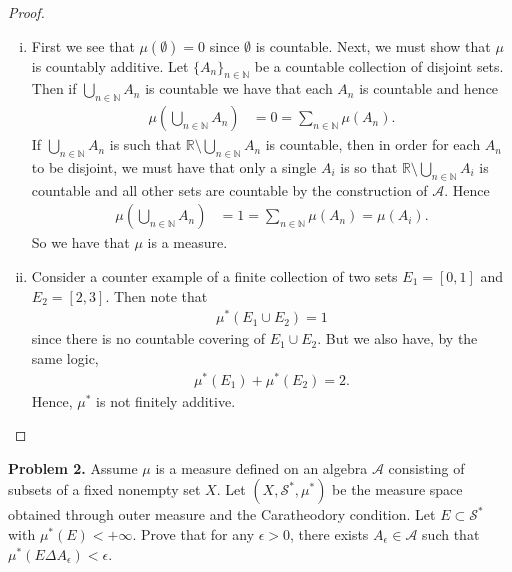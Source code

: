 \documentclass[leqno]{article}
\theoremstyle{nonumberplain}
\newtheorem{proof}{Proof}
\newcommand{\R}{\mathbb{R}}
\newcommand{\N}{\mathbb{N}}
\begin{document}
\begin{proof}~
\begin{enumerate}[(i)]
\item First we see that $\mu(\emptyset)=0$ since $\emptyset$ is countable. Next, we must show that $\mu$ is countably additive. Let $\{A_n\}_{n\in \N}$ be a countable collection of disjoint sets. Then if $\bigcup_{n\in \N} A_n$ is countable we have that each $A_n$ is countable and hence
\begin{align*}
\mu\left( \bigcup_{n\in \N} A_n \right)&=0=\sum_{n \in \N} \mu(A_n).
\end{align*}
If $\bigcup_{n\in \N}A_n$ is such that $\R\setminus \bigcup_{n\in \N}A_n$ is countable, then in order for each $A_n$ to be disjoint, we must have that only a single $A_i$ is so that $\R \setminus \bigcup_{n\in \N}A_i$ is countable and all other sets are countable by the construction of $\mathcal{A}$.  Hence
\begin{align*}
\mu\left(\bigcup_{n\in \N} A_n\right) &=1= \sum_{n\in \N}\mu(A_n) = \mu(A_i). 
\end{align*}
So we have that $\mu$ is a measure.

\item Consider a counter example of a finite collection of two sets $E_1=[0,1]$ and $E_2=[2,3]$.  Then note that
\begin{align*}
\mu^*(E_1\cup E_2)=1
\end{align*}
since there is no countable covering of $E_1\cup E_2$. But we also have, by the same logic, 
\begin{align*}
\mu^*(E_1)+\mu^*(E_2)=2.
\end{align*}
Hence, $\mu^*$ is not finitely additive.
\end{enumerate}
\end{proof}



\pagebreak



\noindent\textbf{Problem 2.} \quad
Assume $\mu$ is a measure defined on an algebra $\mathcal{A}$ consisting of subsets of a fixed nonempty set $X$. Let $(X,\mathcal{S}^*,\mu^*)$ be the measure space obtained through outer measure and the Caratheodory condition. Let $E\subset \mathcal{S}^*$ with $\mu^*(E)<+\infty$. Prove that for any $\epsilon>0$, there exists $A_\epsilon \in \mathcal{A}$ such that $\mu^*(E\Delta A_\epsilon)<\epsilon$.
\end{document}
